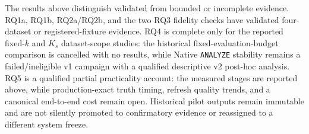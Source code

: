 The results above distinguish validated from bounded or incomplete evidence.
RQ1a, RQ1b, RQ2a/RQ2b, and the two RQ3 fidelity checks have validated
four-dataset or registered-fixture evidence. RQ4 is complete only for the
reported fixed-$k$ and $K_s$ dataset-scope studies: the historical
fixed-evaluation-budget comparison is cancelled with no results, while Native
\texttt{ANALYZE} stability remains a failed/ineligible v1 campaign with a
qualified descriptive v2 post-hoc analysis.
RQ5 is a qualified partial practicality account: the measured stages are
reported above, while production-exact truth timing, refresh quality trends,
and a canonical end-to-end cost remain open. Historical pilot outputs remain
immutable and are not silently promoted to confirmatory evidence or reassigned
to a different system freeze.
